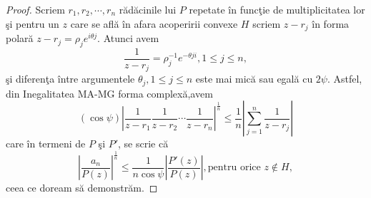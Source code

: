 \documentclass[a4paper,12pt,oneside]{report}
\begin{document}
\begin{proof}
Scriem \(r_{1} , r_{2} ,\cdots,r_{n}\) r\u{a}d\u{a}cinile lui \(P\) repetate \^{i}n func\c{t}ie de multiplicitatea lor \c{s}i pentru un \(z\) care se afl\u{a} \^{i}n afara acoperirii convexe \(H\) scriem \(z - r_{j}\) \^{i}n forma polar\u{a} \(z - r_{j} = \rho _{j}e^{i\theta j}\). Atunci avem
\begin{displaymath}
  \frac{1}{z - r_{j}} = \rho _{j}^{-1}e^{-\theta ji} , 1 \leq  j \leq  n,
\end{displaymath}
\c{s}i diferen\c{t}a \^{i}ntre argumentele \(\theta _{j}, 1 \leq j\leq n\) este mai mic\u{a} sau egal\u{a} cu \(2\psi\). Astfel, din Inegalitatea  MA-MG forma complex\u{a},avem
\begin{displaymath}
  \left ( \cos\psi  \right )\left | \frac{1}{z - r_{1}} \frac{1}{z - r_{2}}\cdots \frac{1}{z - r_{n}} \right|^{\frac{1}{n}} \leq  \frac{1}{n} \left | \sum_{j = 1}^{n}\frac{1}{z - r_{j}} \right |
\end{displaymath}
care \^{i}n termeni de \(P\) \c{s}i \({P}'\), se scrie c\u{a}
\begin{displaymath}
   \left | \frac{a_{n}}{P\left ( z \right )} \right |^{\frac{1}{n}}\leq \frac{1}{n\cos\psi }\left | \frac{{P}'\left ( z \right )}{P\left ( z \right )} \right |,  \text{pentru orice }z \notin H,
\end{displaymath}
 ceea ce doream s\u{a} demonstr\u{a}m.
\end{proof}
\end{document}
